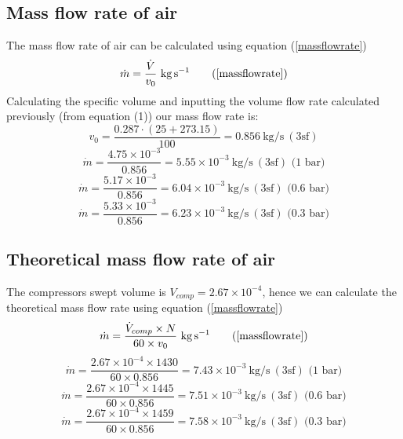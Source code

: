 \documentclass[class=article, crop=false, 12pt,a4paper]{standalone}
\begin{document}
\subsection{Mass flow rate of air}
The mass flow rate of air can be calculated using equation (\ref{massflowrate})
\begin{equation}
  \dot{m} = \frac{\dot{V}}{v_0} \ \si{\kg\per\second}
  \tag{\ref{massflowrate}}
\end{equation}
Calculating the specific volume and inputting the volume flow rate calculated previously (from equation (1)) our mass flow rate is:
\[ v_0 = \frac{0.287 \cdot (25+273.15)}{100} = 0.856 \ \si{\kg\per\second} \ (3\textrm{sf})  \]
\[ \dot{m} = \frac{4.75 \times 10^{-3}}{0.856} = 5.55 \times 10^{-3} \ \si{\kg\per\second} \ (3\textrm{sf}) \textrm{ (1 bar)} \]
\[ \dot{m} = \frac{5.17 \times 10^{-3}}{0.856} = 6.04 \times 10^{-3} \ \si{\kg\per\second} \ (3\textrm{sf}) \textrm{ (0.6 bar)} \]
\[ \dot{m} = \frac{5.33 \times 10^{-3}}{0.856} = 6.23 \times 10^{-3} \ \si{\kg\per\second} \ (3\textrm{sf}) \textrm{ (0.3 bar)} \]
\subsection{Theoretical mass flow rate of air}
The compressors swept volume is \(V_{comp} = 2.67 \times 10^{-4}\), hence we can calculate the theoretical mass flow rate using equation (\ref{massflowrate})
\begin{equation}
  \dot{m} = \frac{\dot{V}_{comp} \times N}{60 \times v_0} \ \si{\kg\per\second}
  \tag{\ref{massflowrate}}
\end{equation}
\[ \dot{m} = \frac{2.67 \times 10^{-4} \times 1430}{60 \times 0.856} = 7.43 \times 10^{-3} \ \si{\kg\per\second} \ (3\textrm{sf}) \textrm{ (1 bar)}\]
\[ \dot{m} = \frac{2.67 \times 10^{-4} \times 1445}{60 \times 0.856} = 7.51 \times 10^{-3} \ \si{\kg\per\second} \ (3\textrm{sf}) \textrm{ (0.6 bar)}\]
\[ \dot{m} = \frac{2.67 \times 10^{-4} \times 1459}{60 \times 0.856} = 7.58 \times 10^{-3} \ \si{\kg\per\second} \ (3\textrm{sf}) \textrm{ (0.3 bar)}\]

\listoffigures
\end{document}
